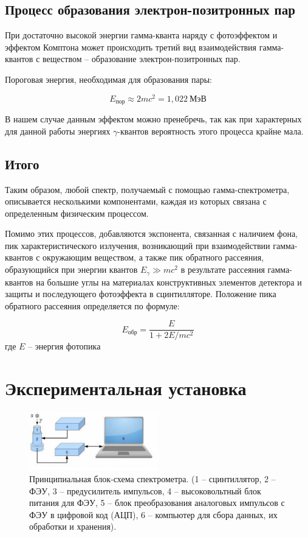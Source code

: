 \documentclass[a4paper, 12pt]{article}
\begin{document}
        \subsection{Процесс образования электрон-позитронных пар}

            При достаточно высокой энергии гамма-кванта наряду с фотоэффектом и эффектом Комптона может происходить третий вид взаимодействия гамма-квантов с веществом -- образование электрон-позитронных пар.

            Пороговая энергия, необходимая для образования пары:

            $$
                E_{пор} \approx 2mc^2 = 1,022~МэВ
            $$

            В нашем случае данным эффектом можно пренебречь, так как при характерных для данной работы энергиях $\gamma$-квантов вероятность этого процесса крайне мала.

        \subsection{Итого}

            Таким образом, любой спектр, получаемый с помощью гамма-спектрометра, описывается несколькими компонентами, каждая из которых связана с определенным физическим процессом.

            Помимо этих процессов, добавляются экспонента, связанная с наличием фона, пик характеристического излучения, возникающий при взаимодействии гамма-квантов с окружающим веществом, а также пик обратного рассеяния, образующийся при энергии квантов $E_{\gamma} \gg mc^2$ в результате рассеяния гамма-квантов на большие углы на материалах конструктивных элементов детектора и защиты и последующего фотоэффекта в сцинтилляторе. Положение пика обратного рассеяния определяется по формуле:

            $$
                E_{обр} = \frac{E}{1 + 2E/mc^2}
            $$
            где $E$ -- энергия фотопика

    \section{Экспериментальная установка}

        \begin{figure}[h!]
            \begin{center}
                \includegraphics[width = 0.5\textwidth]{img/ust_labnik.png}
                \caption{Принципиальная блок-схема спектрометра. (1 – сцинтиллятор, 2 – ФЭУ, 3 – предусилитель импульсов, 4 – высоковольтный блок питания для ФЭУ, 5 – блок преобразования аналоговых импульсов с ФЭУ в цифровой код (АЦП), 6 – компьютер для сбора данных, их обработки и хранения).}
                \label{img:ust_labnik}
            \end{center}
        \end{figure}
\end{document}
